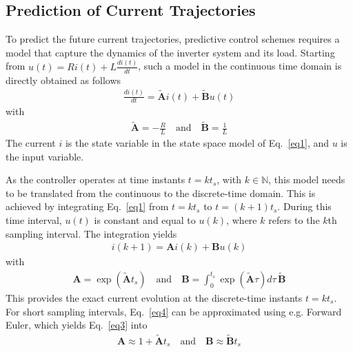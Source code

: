\documentclass[11pt,a4paper,oneside]{book}
\numberwithin{equation}{section}
\theoremstyle{it}
\theoremstyle{definition}
\begin{document}
\subsection{Prediction of Current Trajectories} 
To predict the future current trajectories, predictive control schemes requires 
a model that capture the dynamics of the inverter system and its load. Starting 
from $u(t)=Ri(t)+L\frac{di(t)}{dt}$, such a model in the continuous time domain 
is directly obtained as follows
\begin{equation}\label{eq1}
	\begin{aligned}
		\frac{di(t)}{dt} = \tilde{\mathbf{A}}i(t) + \tilde{\mathbf{B}}u(t)
	\end{aligned}
\end{equation} 
with 
\begin{equation}\label{eq2}
	\begin{aligned}
		\tilde{\mathbf{A}}=-\frac{R}{L}\quad\text{and}\quad\tilde{\mathbf{B}}=\frac{1}{L}
	\end{aligned}
\end{equation} 
The current $i$ is the state variable in the state space model of 
Eq.~\eqref{eq1}, and $u$ is the input variable.

As the controller operates at time instants $t=kt_s$, with $k\in\mathbb{N}$, 
this model needs to be translated from the continuous to the discrete-time 
domain. This is achieved by integrating Eq.~\eqref{eq1} from $t=kt_s$ to 
$t=(k+1)t_s$. During this time interval, $u(t)$ is constant and equal to 
$u(k)$, where $k$ refers to the $k$th sampling interval. The integration yields
\begin{equation}\label{eq3}
	\begin{aligned}
		i(k+1)={\mathbf{A}}i(k) + {\mathbf{B}}u(k)
	\end{aligned}
\end{equation}
with 
\begin{equation}\label{eq4}
	\begin{aligned}
		{\mathbf{A}}=\exp(\tilde{\mathbf{A}}t_s)\quad \text{and} \quad  
		{\mathbf{B}}=\int_{0}^{t_s}\exp(\tilde{\mathbf{A}}\tau)d\tau\,\tilde{\mathbf{B}}
	\end{aligned}
\end{equation}
This provides the exact current evolution at the discrete-time instants 
$t=kt_s$. For short sampling intervals, Eq.~\eqref{eq4} can be approximated 
using e.g. Forward Euler, which yields Eq.~\eqref{eq3} into
\begin{equation}\label{eq5}
	\begin{aligned}
		{\mathbf{A}} \approx 1 + \tilde{\mathbf{A}}t_s\quad \text{and} \quad  
		{\mathbf{B}} \approx \tilde{\mathbf{B}}t_s
	\end{aligned}
\end{equation}
\end{document}
